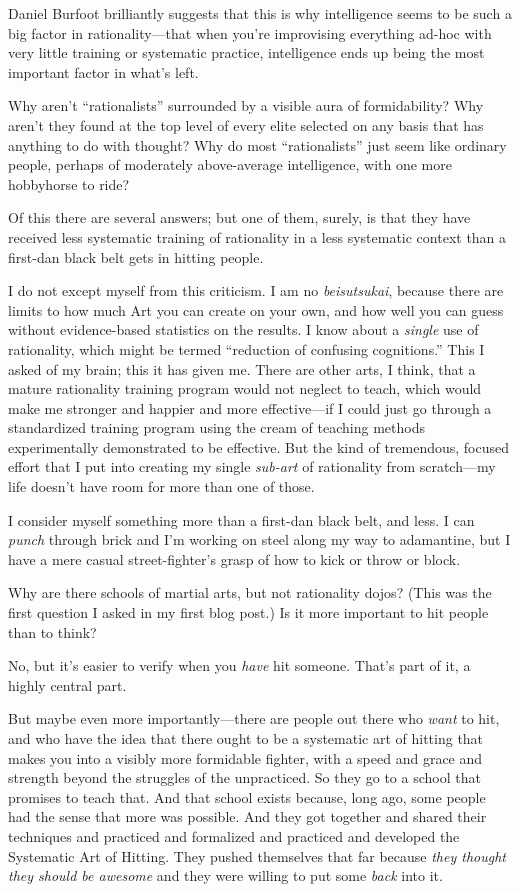 {
 Daniel Burfoot brilliantly suggests that this is why intelligence
seems to be such a big factor in rationality---that when
you're improvising everything ad-hoc with very little
training or systematic practice, intelligence ends up being the most
important factor in what's left.}

{
 Why aren't
``rationalists'' surrounded by a
visible aura of formidability? Why aren't they found at
the top level of every elite selected on any basis that has anything to
do with thought? Why do most
``rationalists'' just seem like
ordinary people, perhaps of moderately above-average intelligence, with
one more hobbyhorse to ride?}

{
 Of this there are several answers; but one of them, surely, is
that they have received less systematic training of rationality in a
less systematic context than a first-dan black belt gets in hitting
people.}

{
 I do not except myself from this criticism. I am no
\textit{beisutsukai}, because there are limits to how much Art you can
create on your own, and how well you can guess without evidence-based
statistics on the results. I know about a \textit{single} use of
rationality, which might be termed ``reduction of
confusing cognitions.'' This I asked of my brain;
this it has given me. There are other arts, I think, that a mature
rationality training program would not neglect to teach, which would
make me stronger and happier and more effective---if I could just go
through a standardized training program using the cream of teaching
methods experimentally demonstrated to be effective. But the kind of
tremendous, focused effort that I put into creating my single
\textit{sub-art} of rationality from scratch---my life
doesn't have room for more than one of those.}

{
 I consider myself something more than a first-dan black belt, and
less. I can \textit{punch} through brick and I'm
working on steel along my way to adamantine, but I have a mere casual
street-fighter's grasp of how to kick or throw or
block.}

{
 Why are there schools of martial arts, but not rationality dojos?
(This was the first question I asked in my first blog post.) Is it more
important to hit people than to think?}

{
 No, but it's easier to verify when you
\textit{have} hit someone. That's part of it, a highly
central part.}

{
 But maybe even more importantly---there are people out there who
\textit{want} to hit, and who have the idea that there ought to be a
systematic art of hitting that makes you into a visibly more formidable
fighter, with a speed and grace and strength beyond the struggles of
the unpracticed. So they go to a school that promises to teach that.
And that school exists because, long ago, some people had the sense
that more was possible. And they got together and shared their
techniques and practiced and formalized and practiced and developed the
Systematic Art of Hitting. They pushed themselves that far because
\textit{they thought they should be awesome} and they were willing to
put some \textit{back} into it.}

